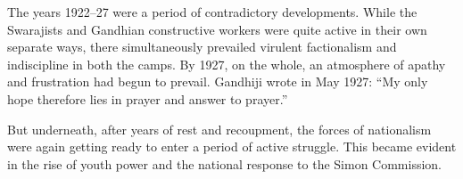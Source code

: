 \begin{multicols}{2}
The years 1922--27 were a period of contradictory developments. While the Swarajists and Gandhian constructive workers were quite active in their own separate ways, there simultaneously prevailed virulent factionalism and indiscipline in both the camps. By 1927, on the whole, an atmosphere of apathy and frustration had begun to prevail. Gandhiji wrote in May 1927: ``My only hope therefore lies in prayer and answer to prayer.''

But underneath, after years of rest and recoupment, the forces of nationalism were again getting ready to enter a period of active struggle. This became evident in the rise of youth power and the national response to the Simon Commission.

\end{multicols}
